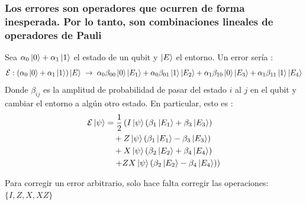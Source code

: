 \begin{frame}
  \frametitle{Los errores son operadores que ocurren de forma inesperada. Por lo tanto, son combinaciones lineales de operadores de Pauli}
  Sea $\alpha_0 \ket{0} + \alpha_1 \ket{1}$ el estado de un qubit y $\ket{E}$ el entorno. Un error sería \citep{Mosca2007}:
  \begin{equation}
    \mathcal{E} : (\alpha_0\ket{0} + \alpha_1\ket{1})\ket{E} \;\to\; \alpha_0\beta_{00} \ket{0}\ket{E_1} + \alpha_0\beta_{01} \ket{1}\ket{E_2} + \alpha_1\beta_{10} \ket{0}\ket{E_3} + \alpha_1\beta_{11} \ket{1}\ket{E_4}
  \end{equation}
  Donde $\beta_{ij}$ es la amplitud de probabilidad de pasar del estado $i$ al $j$ en el qubit y cambiar el entorno a algún otro estado. En particular, esto es \citep{Mosca2007}:
  \begin{equation}
    \begin{aligned}
    \mathcal{E} \ket{\psi}
    &= \frac{1}{2} \left( I\ket{\psi}\left(\beta_1 \ket{E_1} + \beta_3 \ket{E_3}\right) \right. \\
    &\quad + Z\ket{\psi}\left(\beta_1 \ket{E_1} - \beta_3 \ket{E_3}\right) \\
    &\quad + X\ket{\psi}\left(\beta_2 \ket{E_2} + \beta_4 \ket{E_4}\right) \\
    &\quad \left. + ZX\ket{\psi}\left(\beta_2 \ket{E_2} - \beta_4 \ket{E_4}\right) \right)
    \end{aligned}
  \end{equation}

  Para corregir un error arbitrario, solo hace falta corregir las operaciones: $\{I, Z, X, XZ\}$
\end{frame}
